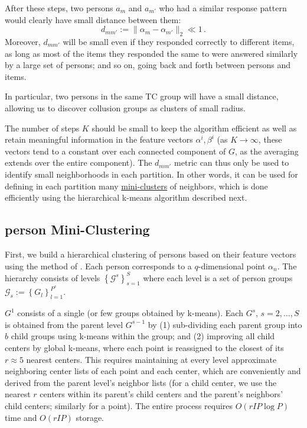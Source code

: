\documentclass{article}
\newcommand{\cG}{\mathcal{G}}
\begin{document}
After these steps, two persons $a_m$ and $a_{m'}$ who had a similar response pattern would clearly have small distance between them:
\begin{equation}
d_{mm'} := \|\alpha_m - \alpha_{m'} \|_2 \ll 1\,.
\end{equation}
Moreover, $d_{mm'}$ will be small even if they responded correctly to different items, as long as most of the items they responded the same to were answered similarly by a large set of persons; and so on, going back and forth between persons and items.

In particular, two persons in the same TC group will have a small distance, allowing us to discover collusion groups as clusters of small radius.

The number of steps $K$ should be small to keep the algorithm efficient as well as retain meaningful information in the feature vectors $\alpha^i, \beta^i$ (as $K \rightarrow \infty$, these vectors tend to a constant over each connected component of $G$, as the averaging extends over the entire component). The $d_{mm'}$ metric can thus only be used to identify small neighborhoods in each partition. In other words, it can be used for defining in each partition many \underline{mini-clusters} of neighbors, which is done efficiently using the hierarchical k-means algorithm described next.

\subsection{person Mini-Clustering}
\label{miniclustering}
First, we build a hierarchical clustering of persons based on their feature vectors using the method of \cite{miniclustering}. Each person corresponds to a $q$-dimensional point $\alpha_n$. The hierarchy consists of levels $\left\{\cG^s\right\}_{s=1}^S$ where each level is a set of person groups $\cG_s := \left\{G_l\right\}_{l=1}^{P^s}$.

$G^1$ consists of a single (or few groups obtained by k-means). Each $G^s$, $s=2,\dots,S$ is obtained from the parent level $G^{s-1}$ by (1) sub-dividing each parent group into $b$ child groups using k-means within the group; and (2) improving all child centers by global k-means, where each point is reassigned to the closest of its $r \approx 5$ nearest centers. This requires maintaining at every level approximate neighboring center lists of each point and each center, which are conveniently and derived from the parent level's neighbor lists (for a child center, we use the nearest $r$ centers within its parent's child centers and the parent's neighbors' child centers; similarly for a point). The entire process requires $O(r I P \log P)$ time and $O(r I P)$ storage.
\end{document}
